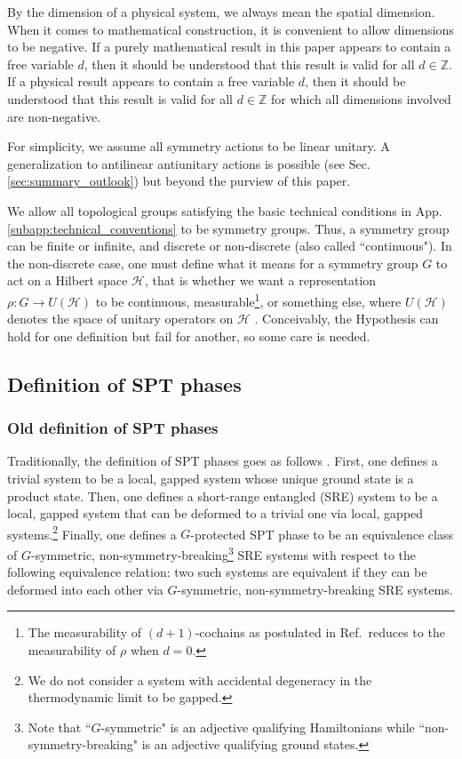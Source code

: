 \documentclass[sort&compress]{elsarticle}
\theoremstyle{theoremstyle}
\theoremstyle{framedtheoremstyle}
\theoremstyle{definitionstyle}
\theoremstyle{definitionstyle}
\theoremstyle{definitionstyle}
\theoremstyle{definitionstyle}
\theoremstyle{nameddefinitionstyle}
\theoremstyle{framednameddefinitionstyle}
\theoremstyle{proofstyle}
\theoremstyle{definitionstyle}
\newcommand{\fromto}{\rightarrow}
\newcommand{\ZZZ}{\mathbb{Z}}
\begin{document}
By the dimension of a physical system, we always mean the spatial dimension. When it comes to mathematical construction, it is convenient to allow dimensions to be negative. If a purely mathematical result in this paper appears to contain a free variable $d$, then it should be understood that this result is valid for all $d\in \ZZZ$. If a physical result appears to contain a free variable $d$, then it should be understood that this result is valid for all $d\in \ZZZ$ for which all dimensions involved are non-negative.

For simplicity, we assume all symmetry actions to be linear unitary. A generalization to antilinear antiunitary actions is possible (see Sec.\,\ref{sec:summary_outlook}) but beyond the purview of this paper.

We allow all topological groups satisfying the basic technical conditions in App.\,\ref{subapp:technical_conventions} to be symmetry groups. Thus, a symmetry group can be finite or infinite, and discrete or non-discrete (also called ``continuous").
In the non-discrete case, one must define what it means for a symmetry group $G$ to act on a Hilbert space $\mathscr H$, that is whether we want a representation $\rho: G \fromto U(\mathscr H)$ to be continuous, measurable\footnote{The measurability of $(d+1)$-cochains as postulated in Ref.\,\cite{Wen_Boson} reduces to the measurability of $\rho$ when $d=0$.}, or something else, where $U(\mathscr H)$ denotes the space of unitary operators on $\mathscr H$ \cite{Wen_Boson}.
Conceivably, the Hypothesis can hold for one definition but fail for another,
so some care is needed.










\subsection{Definition of SPT phases\label{subsec:definition_SPT_phases}}

\subsubsection{Old definition of SPT phases\label{subsubsec:old_definition_SPT_phases}}

Traditionally, the definition of SPT phases goes as follows \cite{Wen_Definition, Cirac}. First, one defines a trivial system to be a local, gapped system whose unique ground state is a product state. Then, one defines a short-range entangled (SRE) system to be a local, gapped system that can be deformed to a trivial one via local, gapped systems.\footnote{We do not consider a system with accidental degeneracy in the thermodynamic limit to be gapped.} Finally, one defines a $G$-protected SPT phase to be an equivalence class of $G$-symmetric, non-symmetry-breaking\footnote{Note that ``$G$-symmetric" is an adjective qualifying Hamiltonians while ``non-symmetry-breaking" is an adjective qualifying ground states.} SRE systems with respect to the following equivalence relation: two such systems are equivalent if they can be deformed into each other via $G$-symmetric, non-symmetry-breaking SRE systems.
\end{document}
